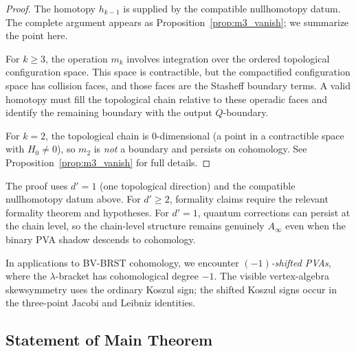 \begin{proof}
The homotopy $h_{k-1}$ is supplied by the compatible
nullhomotopy datum. The complete argument appears as
Proposition~\ref{prop:m3_vanish}; we summarize the point here.

For $k \geq 3$, the operation $m_k$ involves integration over the
ordered topological configuration space. This space is contractible,
but the compactified configuration space has collision faces, and
those faces are the Stasheff boundary terms. A valid homotopy must
fill the topological chain relative to these operadic faces and
identify the remaining boundary with the output $Q$-boundary.

For $k=2$, the topological chain is $0$-dimensional (a point in a
contractible space with $H_0 \neq 0$), so $m_2$ is \emph{not} a
boundary and persists on cohomology. See
Proposition~\ref{prop:m3_vanish} for full details.
\end{proof}

\begin{remark}[Formality fails for $d'=1$]
The proof uses $d' = 1$ (one topological direction) and the compatible
nullhomotopy datum above. For $d' \geq 2$, formality claims require
the relevant formality theorem and hypotheses. For $d' = 1$, quantum
corrections can persist at the chain level, so the chain-level
structure remains genuinely $A_\infty$ even when the binary PVA shadow
descends to cohomology.
\end{remark}


\begin{remark}
In applications to BV-BRST cohomology, we encounter
\emph{$(-1)$-shifted PVAs}, where the $\lambda$-bracket has
cohomological degree $-1$. The visible vertex-algebra skewsymmetry
uses the ordinary Koszul sign; the shifted Koszul signs occur in the
three-point Jacobi and Leibniz identities.
\end{remark}

\subsection{Statement of Main Theorem}

